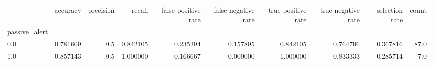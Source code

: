 \begin{tabular}{lrrrrrrrrr}
\toprule
{} &  accuracy &  precision &    recall &  false positive rate &  false negative rate &  true positive rate &  true negative rate &  selection rate &  count \\
passive\_alert &           &            &           &                      &                      &                     &                     &                 &        \\
\midrule
0.0           &  0.781609 &        0.5 &  0.842105 &             0.235294 &             0.157895 &            0.842105 &            0.764706 &        0.367816 &   87.0 \\
1.0           &  0.857143 &        0.5 &  1.000000 &             0.166667 &             0.000000 &            1.000000 &            0.833333 &        0.285714 &    7.0 \\
\bottomrule
\end{tabular}
